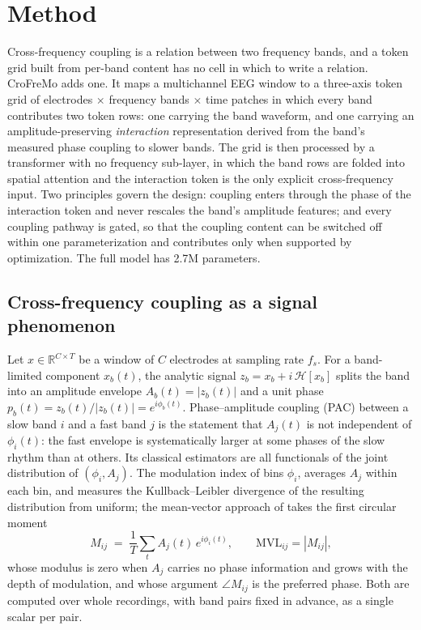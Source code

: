 \section{Method}
\label{sec:method}

Cross-frequency coupling is a relation between two frequency bands, and a
token grid built from per-band content has no cell in which to write a
relation. CroFreMo adds one. It maps a multichannel EEG window to a
three-axis token grid of electrodes $\times$ frequency bands $\times$ time
patches in which every band contributes two token rows: one carrying the
band waveform, and one carrying an amplitude-preserving \emph{interaction}
representation derived from the band's measured phase coupling to slower
bands. The grid is then processed by a transformer with no frequency sub-layer, in which the band rows are folded into spatial attention and the interaction token is the only explicit cross-frequency input.
Two principles govern the design: coupling enters through the phase of the
interaction token and never rescales the band's amplitude features; and
every coupling pathway is gated, so that the coupling content can be
switched off within one parameterization and contributes only when
supported by optimization. The full model has 2.7M
parameters.

\subsection{Cross-frequency coupling as a signal phenomenon}
\label{sec:phenomenon}

Let $x \in \mathbb{R}^{C \times T}$ be a window of $C$ electrodes at
sampling rate $f_s$. For a band-limited component $x_b(t)$, the analytic
signal $z_b = x_b + i\,\mathcal{H}[x_b]$ splits the band into an amplitude
envelope $A_b(t) = |z_b(t)|$ and a unit phase $p_b(t) = z_b(t)/|z_b(t)|
= e^{i\phi_b(t)}$. Phase--amplitude coupling (PAC) between a slow band $i$
and a fast band $j$ is the statement that $A_j(t)$ is not independent of
$\phi_i(t)$: the fast envelope is systematically larger at some phases of
the slow rhythm than at others. Its classical estimators are all functionals
of the joint distribution of $(\phi_i, A_j)$. The modulation index of
\citet{tort2010measuring} bins $\phi_i$, averages $A_j$ within each bin, and
measures the Kullback--Leibler divergence of the resulting distribution
from uniform; the mean-vector approach of \citet{canolty2006high} takes the
first circular moment
\begin{equation}
M_{ij} \;=\; \frac{1}{T}\sum_{t} A_j(t)\,e^{i\phi_i(t)}, \qquad
\mathrm{MVL}_{ij} = |M_{ij}| ,
\label{eq:mvl-classical}
\end{equation}
whose modulus is zero when $A_j$ carries no phase information and grows
with the depth of modulation, and whose argument $\angle M_{ij}$ is the
preferred phase.
Both are computed over whole recordings, with band pairs fixed in advance,
as a single scalar per pair.

